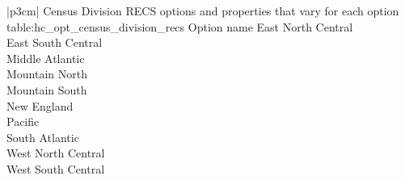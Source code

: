 \begin{customLongTable}{ |p{3cm}| }
{Census Division RECS options and properties that vary for each option} {table:hc_opt_census_division_recs}
{Option name}
East North Central \\ \hline
East South Central \\ \hline
Middle Atlantic \\ \hline
Mountain North \\ \hline
Mountain South \\ \hline
New England \\ \hline
Pacific \\ \hline
South Atlantic \\ \hline
West North Central \\ \hline
West South Central \\
\end{customLongTable}
